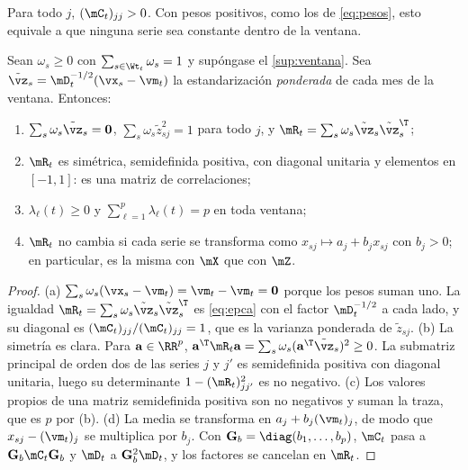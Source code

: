 \begin{supuesto}\label{sup:ventana}
Para todo $j$, $(\mC_t)_{jj}>0$. Con pesos positivos, como los de \cref{eq:pesos}, esto equivale a
que ninguna serie sea constante dentro de la ventana.
\end{supuesto}

\begin{proposicion}\label{prop:epca}
Sean $\omega_s\ge0$ con $\sum_{s\in\Wt_t}\omega_s=1$ y supóngase el \cref{sup:ventana}. Sea
$\tilde\vz_s=\mD_t^{-1/2}(\vx_s-\vm_t)$ la estandarización \emph{ponderada} de cada mes de la
ventana. Entonces:
\begin{enumerate}[label=(\alph*)]
  \item $\sum_s\omega_s\tilde\vz_s=\mathbf{0}$, $\sum_s\omega_s\tilde z_{sj}^2=1$ para todo $j$, y
    $\mR_t=\sum_s\omega_s\tilde\vz_s\tilde\vz_s^{\T}$;
  \item $\mR_t$ es simétrica, semidefinida positiva, con diagonal unitaria y elementos en
    $[-1,1]$: es una matriz de correlaciones;
  \item $\lambda_\ell(t)\ge0$ y $\sum_{\ell=1}^{p}\lambda_\ell(t)=p$ en toda ventana;
  \item $\mR_t$ no cambia si cada serie se transforma como $x_{sj}\mapsto a_j+b_jx_{sj}$ con
    $b_j>0$; en particular, es la misma con $\mX$ que con $\mZ$.
\end{enumerate}
\end{proposicion}

\begin{proof}
(a) $\sum_s\omega_s(\vx_s-\vm_t)=\vm_t-\vm_t=\mathbf{0}$ porque los pesos suman uno. La
igualdad $\mR_t=\sum_s\omega_s\tilde\vz_s\tilde\vz_s^{\T}$ es \cref{eq:epca} con el factor
$\mD_t^{-1/2}$ a cada lado, y su diagonal es $(\mC_t)_{jj}/(\mC_t)_{jj}=1$, que es la varianza
ponderada de $\tilde z_{sj}$. (b) La simetría es clara. Para $\mathbf{a}\in\RR^p$,
$\mathbf{a}^{\T}\mR_t\mathbf{a}=\sum_s\omega_s(\mathbf{a}^{\T}\tilde\vz_s)^2\ge0$. La submatriz
principal de orden dos de las series $j$ y $j'$ es semidefinida positiva con diagonal unitaria,
luego su determinante $1-(\mR_t)_{jj'}^2$ es no negativo. (c) Los valores propios de una matriz
semidefinida positiva son no negativos y suman la traza, que es $p$ por (b). (d) La media se
transforma en $a_j+b_j(\vm_t)_j$, de modo que $x_{sj}-(\vm_t)_j$ se multiplica por $b_j$. Con
$\mathbf{G}_b=\diag(b_1,\dots,b_p)$, $\mC_t$ pasa a $\mathbf{G}_b\mC_t\mathbf{G}_b$ y $\mD_t$ a
$\mathbf{G}_b^2\mD_t$, y los factores se cancelan en $\mR_t$.
\end{proof}

